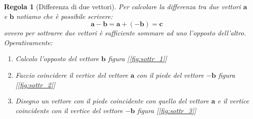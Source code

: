 \documentclass[a4paper,10pt,oneside]{article}
\newtheorem{regola}{Regola}
\begin{document}
\begin{regola}[Differenza di due vettori]
 Per calcolare la differenza tra due vettori $\mathbf{a}$ e $\mathbf{b}$ notiamo che è possibile scrivere:
\begin{equation*}
 \mathbf{a}-\mathbf{b}=\mathbf{a}+(-\mathbf{b})=\mathbf{c}
\end{equation*}
ovvero per sottrarre due vettori è sufficiente sommare ad uno l'opposto dell'altro. Operativamente:
\begin{enumerate}
 \item Calcolo l'opposto del vettore $\mathbf{b}$ figura [\ref{fig:sottr_1}]
\item Faccio coincidere il vertice del vettore $\mathbf{a}$ con il piede del vettore $- \mathbf{b}$ figura [\ref{fig:sottr_2}]
\item Disegno un vettore con il piede coincidente con quello del vettore $\mathbf{a}$ e il vertice coincidente con il vertice del vettore $-\mathbf{b}$ figura [\ref{fig:sottr_3}]
\end{enumerate}
\end{regola}
\end{document}
